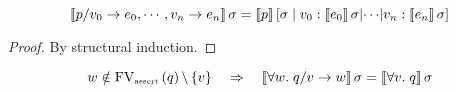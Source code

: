 \begin{enumcirc}
	\begin{property}
		\[
			\left\llbracket p/v_0 \rightarrow e_0, \cdots , v_n \rightarrow e_n \right\rrbracket\sigma =
			\left\llbracket p \right\rrbracket\left[ \sigma \; \middle\vert \; v_0 : \left\llbracket e_0 \right\rrbracket\sigma \middle\vert \cdots \middle\vert v_n : \left\llbracket e_n \right\rrbracket\sigma \right]
		\]
	\end{property}
	\begin{proof}
		By structural induction.
	\end{proof}

	\begin{property}
		\[
			w \notin \textrm{FV}_{\textrm{\tiny assert}}\left(  q  \right) \backslash \left\{ v \right\} \quad \Rightarrow \quad
			\left\llbracket \forall w .\; q / v \rightarrow w \right\rrbracket\sigma = \left\llbracket \forall v .\; q \right\rrbracket\sigma
		\]
	\end{property}

\end{enumcirc}